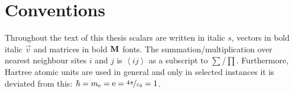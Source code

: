 \documentclass[ 10pt,
                DIV=10,
                headtopline=0.08em,
                headsepline=0.04em,
                headinclude,
                BCOR=6mm
              ]{scrbook}
\begin{document}
    
	\frontmatter
    
    
    
    {\hypersetup{hidelinks}\tableofcontents}%
    \section*{Conventions}
    Throughout the text of this thesis scalars are written in italic $s$, vectors in bold italic $\vec v$ and matrices in bold $\textbf M$ fonts. The summation/multiplication over nearest neighbour sites $i$ and $j$ is $\left\langle ij \right\rangle$ as a subscript to $\sum$/$\prod$. Furthermore, Hartree atomic units are used in general and only in selected instances it is deviated from this: $\hbar = m_\mathrm{e} = \mathrm e = \nicefrac{4\pi}{\varepsilon_0} = 1$. 
    \newpage
    \nonfrenchspacing

    \mainmatter
    \renewcommand{\thechapter}{\Roman{chapter}}
    

    

    \cleardoublepage
    \printbibliography
\end{document}
